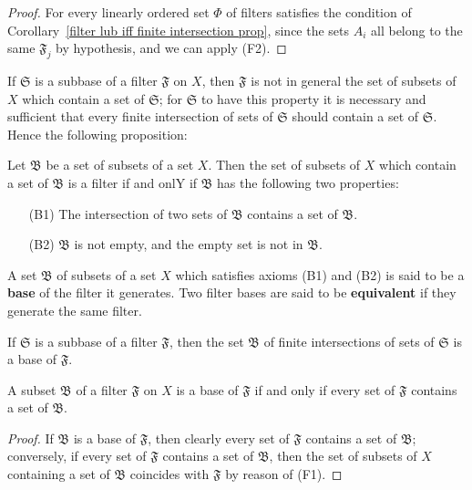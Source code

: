 \begin{proof}
For every linearly ordered set $\Phi$ of filters satisfies the condition of Corollary~\ref{filter lub iff finite intersection prop}, since the sets $A_i$ all belong to the same $\mathfrak{F}_j$ by hypothesis, and we can apply (F2).
\end{proof}
If $\mathfrak{S}$ is a subbase of a filter $\mathfrak{F}$ on $X$, then $\mathfrak{F}$ is not in general the set of subsets of $X$ which contain a set of $\mathfrak{S}$; for $\mathfrak{S}$ to have this property it is necessary and sufficient that every finite intersection of sets of $\mathfrak{S}$ should contain a set of $\mathfrak{S}$. Hence the following proposition:
\begin{proposition}
Let $\mathfrak{B}$ be a set of subsets of a set $X$. Then the set of subsets of $X$ which contain a set of $\mathfrak{B}$ is a filter if and onlY if $\mathfrak{B}$ has the following two properties:
\begin{itemize}
\item[(B1)] The intersection of two sets of $\mathfrak{B}$ contains a set of $\mathfrak{B}$.
\item[(B2)] $\mathfrak{B}$ is not empty, and the empty set is not in $\mathfrak{B}$.
\end{itemize}
\end{proposition}
\begin{definition}
A set $\mathfrak{B}$ of subsets of a set $X$ which satisfies axioms (B1) and (B2) is said to be a \textbf{base} of the filter it generates. Two filter bases are said to be \textbf{equivalent} if they generate the same filter.
\end{definition}
If $\mathfrak{S}$ is a subbase of a filter $\mathfrak{F}$, then the set $\mathfrak{B}$ of finite intersections of sets of $\mathfrak{S}$ is a base of $\mathfrak{F}$.
\begin{proposition}\label{filter base iff}
A subset $\mathfrak{B}$ of a filter $\mathfrak{F}$ on $X$ is a base of $\mathfrak{F}$ if and only if every set of $\mathfrak{F}$ contains a set of $\mathfrak{B}$.
\end{proposition}
\begin{proof}
If $\mathfrak{B}$ is a base of $\mathfrak{F}$, then clearly every set of $\mathfrak{F}$ contains a set of $\mathfrak{B}$; conversely, if every set of $\mathfrak{F}$ contains a set of $\mathfrak{B}$, then the set of subsets of $X$ containing a set of $\mathfrak{B}$ coincides with $\mathfrak{F}$ by reason of (F1).
\end{proof}
